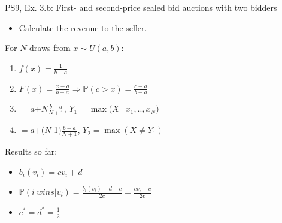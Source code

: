 \begin{frame}{PS9, Ex. 3.b: First- and second-price sealed bid auctions with two bidders}
    \begin{multicols}{2}
      \begin{itemize}
        \item[(b)] Calculate the revenue to the seller.
      \end{itemize}
      \vfill\null\columnbreak
      For $N$ draws from $x\sim U(a, b):$
      \vspace{-6pt}
      \begin{enumerate}
        \item[PDF:] $f(x)=\frac{1}{b-a}$
        \item[CDF:] $F(x)=\frac{x-a}{b-a}\Rightarrow\mathbb{P}(c>x)=\frac{c-a}{b-a}$
        \item[$\mathbb{E}(Y_1)$] $=a$+$N\frac{b-a}{N+1}$, $Y_1=\max(X$=$x_1,..,x_N)$
        \item[$\mathbb{E}(Y_2)$] $=a$+$(N$-1$)\frac{b-a}{N+1}$, $Y_2=\max(X\neq Y_1)$
      \end{enumerate}
      \vspace{-6pt}
      Results so far:
      \vspace{-6pt}
      \begin{itemize}
        \item[($*$)]  $b_i(v_i) = cv_i+d$
        \item[($**$)] $\mathbb{P}(i\ wins|v_i)=\frac{b_i(v_i)-d-c}{2c}=\frac{cv_i-c}{2c}$
        \item[(3.a)]    $c^*=d^*=\frac{1}{2}$
      \end{itemize}
      \vfill\null
    \end{multicols}
\end{frame}
